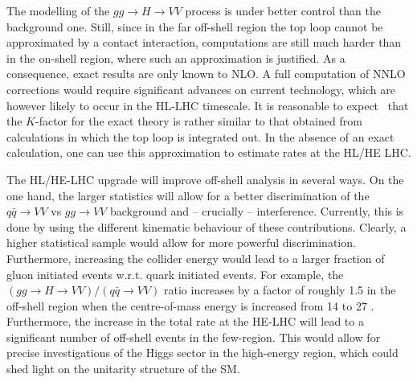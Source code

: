 The modelling of the $gg\to H\to VV$ process is under better control than the background one. 
Still, since
in the far off-shell region the top loop cannot be approximated by a contact interaction,
computations are still much harder than in the on-shell region, where such an approximation is justified. As a consequence, exact results are
only known to NLO. A full computation of NNLO corrections would require significant advances on 
current technology, which are however likely to occur in the HL-LHC timescale. It is reasonable
to expect~\cite{deFlorian:2016spz} 
that the $K$-factor for the exact theory is rather similar to that obtained from calculations in which
the top loop is integrated out. In the absence of an exact calculation, one can use this 
approximation to estimate rates at the HL/HE LHC. 

The HL/HE-LHC upgrade will improve off-shell analysis in several ways. On the one hand,
the larger statistics will allow for a better discrimination of the $q\bar q\to VV$ vs
$gg\to VV$ background and -- crucially -- interference. Currently, this is done by using
the different kinematic behaviour of these contributions. Clearly, a higher statistical
sample would allow for more powerful discrimination. Furthermore, increasing the collider
energy would lead to a larger fraction of gluon initiated events w.r.t. quark initiated
events. For example, the $(gg\to H\to VV)/(q\bar q\to VV)$ ratio increases by a factor of roughly
1.5 in the off-shell region when the centre-of-mass energy is increased from 14 \UTeV to 27 \UTeV. Furthermore, the increase in the total rate at the HE-LHC
will lead to a significant number of off-shell events in the few-\UTeV region. This would
allow for precise investigations of the Higgs sector in the high-energy region, which could 
shed light on the unitarity structure of the SM. 
